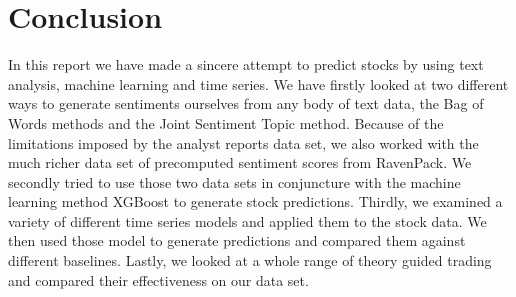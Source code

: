 \chapter{Conclusion}\label{ch:conclusion}

In this report we have made a sincere attempt to predict stocks by using text analysis, machine learning and time series. We have firstly looked at two different ways to generate sentiments ourselves from any body of text data, the Bag of Words methods and the Joint Sentiment Topic method. Because of the limitations imposed by the analyst reports data set, we also worked with the much richer data set of precomputed sentiment scores from RavenPack. We secondly tried to use those two data sets in conjuncture with the machine learning method XGBoost to generate stock predictions. Thirdly, we examined a variety of different time series models and applied them to the stock data. We then used those model to generate predictions and compared them against different baselines. Lastly, we looked at a whole range of theory guided trading and compared their effectiveness on our data set.

